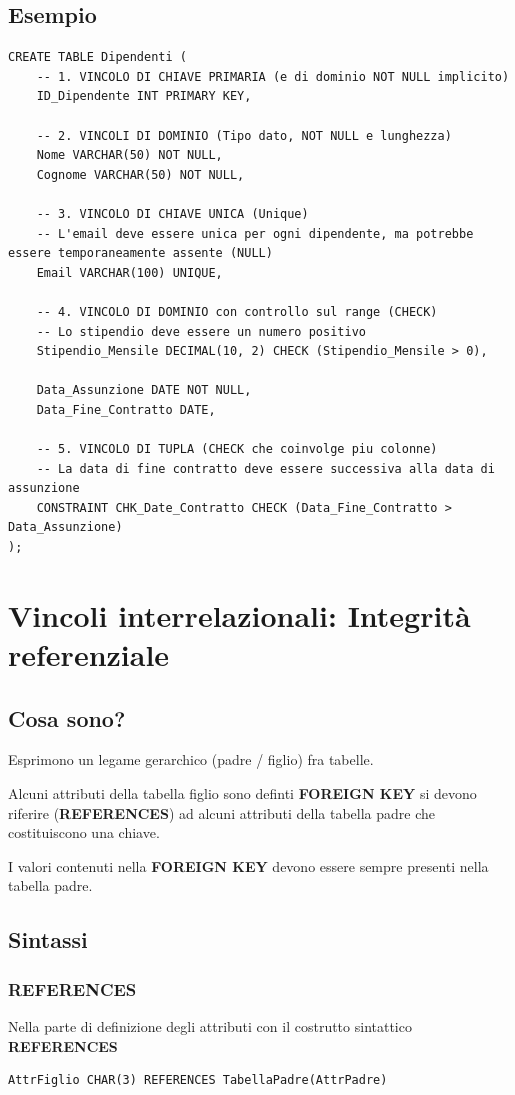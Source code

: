 \subsection{Esempio}
\begin{lstlisting}[language=sql_generic]
CREATE TABLE Dipendenti (
    -- 1. VINCOLO DI CHIAVE PRIMARIA (e di dominio NOT NULL implicito)
    ID_Dipendente INT PRIMARY KEY,
    
    -- 2. VINCOLI DI DOMINIO (Tipo dato, NOT NULL e lunghezza)
    Nome VARCHAR(50) NOT NULL,
    Cognome VARCHAR(50) NOT NULL,
    
    -- 3. VINCOLO DI CHIAVE UNICA (Unique)
    -- L'email deve essere unica per ogni dipendente, ma potrebbe essere temporaneamente assente (NULL)
    Email VARCHAR(100) UNIQUE,
    
    -- 4. VINCOLO DI DOMINIO con controllo sul range (CHECK)
    -- Lo stipendio deve essere un numero positivo
    Stipendio_Mensile DECIMAL(10, 2) CHECK (Stipendio_Mensile > 0),
    
    Data_Assunzione DATE NOT NULL,
    Data_Fine_Contratto DATE,
    
    -- 5. VINCOLO DI TUPLA (CHECK che coinvolge piu colonne)
    -- La data di fine contratto deve essere successiva alla data di assunzione
    CONSTRAINT CHK_Date_Contratto CHECK (Data_Fine_Contratto > Data_Assunzione)
);
\end{lstlisting}

\newpage
\section{Vincoli interrelazionali: Integrità referenziale}
\subsection{Cosa sono?}
Esprimono un legame gerarchico (padre / figlio) fra tabelle.

Alcuni attributi della tabella figlio sono definti \textbf{FOREIGN KEY} si devono riferire (\textbf{REFERENCES}) ad alcuni attributi della tabella padre che costituiscono una chiave.

I valori contenuti nella \textbf{FOREIGN KEY} devono essere sempre presenti nella tabella padre.

\subsection{Sintassi}
\subsubsection{REFERENCES}
Nella parte di definizione degli attributi con il costrutto sintattico \textbf{REFERENCES}
\begin{lstlisting}[language=sql_generic]
AttrFiglio CHAR(3) REFERENCES TabellaPadre(AttrPadre)
\end{lstlisting}

